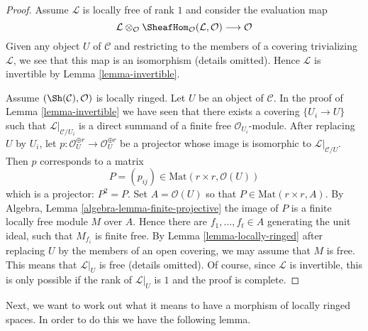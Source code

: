 \begin{proof}
Assume $\mathcal{L}$ is locally free of rank $1$ and consider the
evaluation map
$$
\mathcal{L} \otimes_\mathcal{O}
\SheafHom_\mathcal{O}(\mathcal{L}, \mathcal{O})
\longrightarrow \mathcal{O}
$$
Given any object $U$ of $\mathcal{C}$ and restricting to the members
of a covering trivializing $\mathcal{L}$, we see
that this map is an isomorphism (details omitted).
Hence $\mathcal{L}$ is invertible by Lemma \ref{lemma-invertible}.

\medskip\noindent
Assume $(\Sh(\mathcal{C}), \mathcal{O})$ is locally ringed.
Let $U$ be an object of $\mathcal{C}$.
In the proof of Lemma \ref{lemma-invertible}
we have seen that there exists a covering $\{U_i \to U\}$
such that $\mathcal{L}|_{\mathcal{C}/U_i}$ is a direct summand
of a finite free $\mathcal{O}_{U_i}$-module. After replacing
$U$ by $U_i$, let
$p : \mathcal{O}_U^{\oplus r} \to \mathcal{O}_U^{\oplus r}$
be a projector whose image is isomorphic to $\mathcal{L}|_{\mathcal{C}/U}$.
Then $p$ corresponds to a matrix
$$
P = (p_{ij}) \in \text{Mat}(r \times r, \mathcal{O}(U))
$$
which is a projector: $P^2  = P$. Set $A = \mathcal{O}(U)$
so that $P \in \text{Mat}(r \times r, A)$.
By Algebra, Lemma \ref{algebra-lemma-finite-projective}
the image of $P$ is a finite locally free module $M$ over $A$.
Hence there are $f_1, \ldots, f_t \in A$ generating the unit
ideal, such that $M_{f_i}$ is finite free. By
Lemma \ref{lemma-locally-ringed} after replacing $U$ by the members of an open
covering, we may assume that $M$ is free. This means that
$\mathcal{L}|_U$ is free (details omitted). Of course, since
$\mathcal{L}$ is invertible, this is
only possible if the rank of $\mathcal{L}|_U$ is $1$
and the proof is complete.
\end{proof}

\noindent
Next, we want to work out what it means to have a morphism of locally ringed
spaces. In order to do this we have the following lemma.

